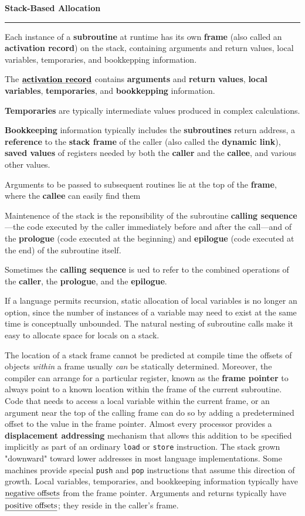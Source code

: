 \nopagenumbers
{\bf Stack-Based Allocation}
\vskip 1mm
\hrule

\vskip 6pt
Each instance of a {\bf subroutine} at runtime has its own {\bf frame} (also called an {\bf activation record}) on the stack, containing arguments and return values, local variables, temporaries, and bookkepping information.

\vskip 6pt
The $\underline{\hbox{{\bf activation record}}}$ contains {\bf arguments} and {\bf return values}, {\bf local variables}, {\bf temporaries}, and {\bf bookkepping} information.

\vskip 6pt

{\bf Temporaries} are typically intermediate values produced in complex calculations.

\vskip 6pt
{\bf Bookkeeping} information typically includes the {\bf subroutines} return address, a {\bf reference} to the {\bf stack frame} of the caller (also called the {\bf dynamic link}), {\bf saved values} of registers needed by both the {\bf caller} and the {\bf callee}, and various other values.

\vskip 6pt
Arguments to be passed to subsequent routines lie at the top of the {\bf frame}, where the {\bf callee} can easily find them

\vskip 6pt
Maintenence of the stack is the reponsibility of the subroutine {\bf calling sequence}---the code executed by the caller immediately before and after the call---and of the {\bf prologue} (code executed at the beginning) and {\bf epilogue} (code executed at the end) of the subroutine itself.

\vskip 6pt
Sometimes the {\bf calling sequence} is ued to refer to the combined operations of the {\bf caller}, the {\bf prologue}, and the {\bf epilogue}.

\vskip 6pt
If a language permits recursion, static allocation of local variables is no longer an option, since the number of instances of a variable may need to exist at the same time is conceptually unbounded. The natural nesting of subroutine calls make it easy to allocate space for locals on a stack.

\vskip 6pt
The location of a stack frame cannot be predicted at compile time the offsets of objects {\it within} a frame usually {\it can} be statically determined. Moreover, the compiler can arrange for a particular register, known as the {\bf frame pointer} to always point to a known location within the frame of the current subroutine. Code that needs to access a local variable within the current frame, or an argument near the top of the calling frame can do so by adding a predetermined offset to the value in the frame pointer. Almost every processor provides a {\bf displacement addressing} mechanism that allows this addition to be specified implicitly as part of an ordinary {\tt load} or {\tt store} instruction. The stack grown "downward" toward lower addresses in most language implementations. Some machines provide special {\tt push} and {\tt pop} instructions that assume this direction of growth. Local variables, temporaries, and bookkeeping information typically have $\underline{\hbox{negative offsets}}$ from the frame pointer. Arguments and returns typically have $\underline{\hbox{positive offsets}}$; they reside in the caller's frame.


\vfill\eject
\bye
